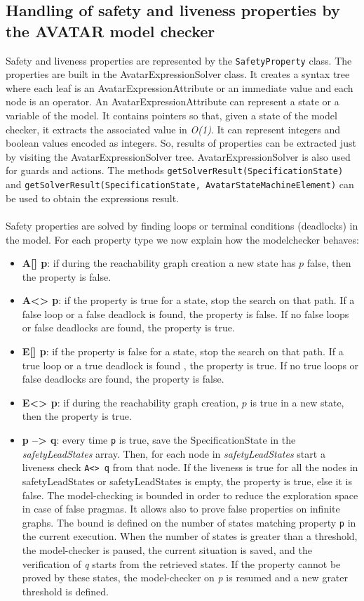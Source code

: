 \documentclass[12pt]{article}
\begin{document}
\subsection{Handling of safety and liveness properties by the AVATAR model checker}
Safety and liveness properties are represented by the \texttt{SafetyProperty} class. The properties are built in the AvatarExpressionSolver class. It creates a syntax tree where each leaf is an AvatarExpressionAttribute or an immediate value and each node is an operator. An AvatarExpressionAttribute can represent a state or a variable of the model. It contains pointers so that, given a state of the model checker, it extracts the associated value in \textit{O(1)}. It can represent integers and boolean values encoded as integers. So, results of properties can be extracted just by visiting the AvatarExpressionSolver tree. AvatarExpressionSolver is also used for guards and actions. The methods \texttt{getSolverResult(SpecificationState)} and \texttt{getSolverResult(SpecificationState, AvatarStateMachineElement)} can be used to obtain the expressions result.
\\\\
Safety properties are solved by finding loops or terminal conditions (deadlocks) in the model. For each property type we now explain how the modelchecker behaves:
\begin{itemize}
	\item \textbf{A[] p}: if during the reachability graph creation a new state has $p$ false, then the property is false.
	\item \textbf{A<> p}: if the property is true for a state, stop the search on that path. If a false loop or a false deadlock is found, the property is false. If no false loops or false deadlocks are found, the property is true.
	\item \textbf{E[] p}:  if the property is false for a state, stop the search on that path. If a true loop or a true deadlock is found , the property is true. If no true loops or false deadlocks are found, the property is false.
	\item \textbf{E<> p}:  if during the reachability graph creation, $p$ is true in a new state,  then the property is true.
	\item \textbf{p --> q}: every time \texttt{p} is true, save the SpecificationState in the \textit{safetyLeadStates} array. Then, for each node in \textit{safetyLeadStates} start a liveness check \texttt{A<> q} from that node. If the liveness is true for all the nodes in safetyLeadStates or safetyLeadStates is empty, the property is true, else it is false. The model-checking is bounded in order to reduce the exploration space in case of false pragmas. It allows also to prove false properties on infinite graphs. The bound is defined on the number of states matching property \texttt{p} in the current execution. When the number of states is greater than a threshold, the model-checker is paused, the current situation is saved, and the verification of \textit{q} starts from the retrieved states. If the property cannot be proved by these states, the model-checker on \textit{p} is resumed and a new grater threshold is defined.
\end{itemize}
\end{document}
